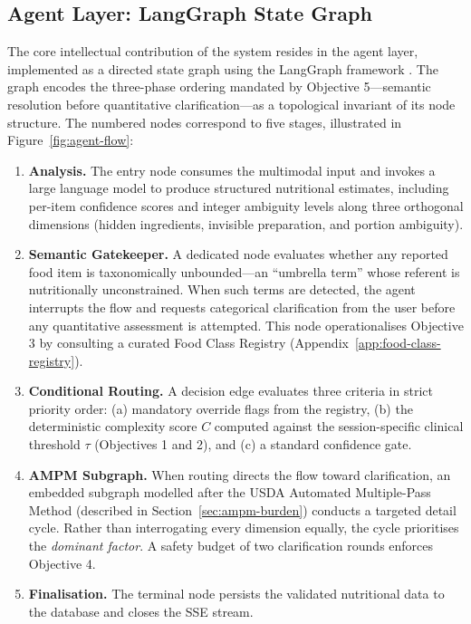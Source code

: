 \subsection{Agent Layer: LangGraph State Graph}
\label{sec:agent-layer}

The core intellectual contribution of the system resides in the agent layer, implemented as a directed state graph using the LangGraph framework \citep{chaseLangChain2022}. The graph encodes the three-phase ordering mandated by Objective 5---semantic resolution before quantitative clarification---as a topological invariant of its node structure. The numbered nodes correspond to five stages, illustrated in Figure~\ref{fig:agent-flow}:

\begin{enumerate}
    \item \textbf{Analysis.} The entry node consumes the multimodal input and invokes a large language model to produce structured nutritional estimates, including per-item confidence scores and integer ambiguity levels along three orthogonal dimensions (hidden ingredients, invisible preparation, and portion ambiguity).

    \item \textbf{Semantic Gatekeeper.} A dedicated node evaluates whether any reported food item is taxonomically unbounded---an ``umbrella term'' whose referent is nutritionally unconstrained. When such terms are detected, the agent interrupts the flow and requests categorical clarification from the user before any quantitative assessment is attempted. This node operationalises Objective 3 by consulting a curated Food Class Registry (Appendix~\ref{app:food-class-registry}).

    \item \textbf{Conditional Routing.} A decision edge evaluates three criteria in strict priority order: (a) mandatory override flags from the registry, (b) the deterministic complexity score $C$ computed against the session-specific clinical threshold $\tau$ (Objectives 1 and 2), and (c) a standard confidence gate.

    \item \textbf{AMPM Subgraph.} When routing directs the flow toward clarification, an embedded subgraph modelled after the USDA Automated Multiple-Pass Method (described in Section~\ref{sec:ampm-burden}) conducts a targeted detail cycle. Rather than interrogating every dimension equally, the cycle prioritises the \emph{dominant factor}. A safety budget of two clarification rounds enforces Objective 4.

    \item \textbf{Finalisation.} The terminal node persists the validated nutritional data to the database and closes the SSE stream.
\end{enumerate}


